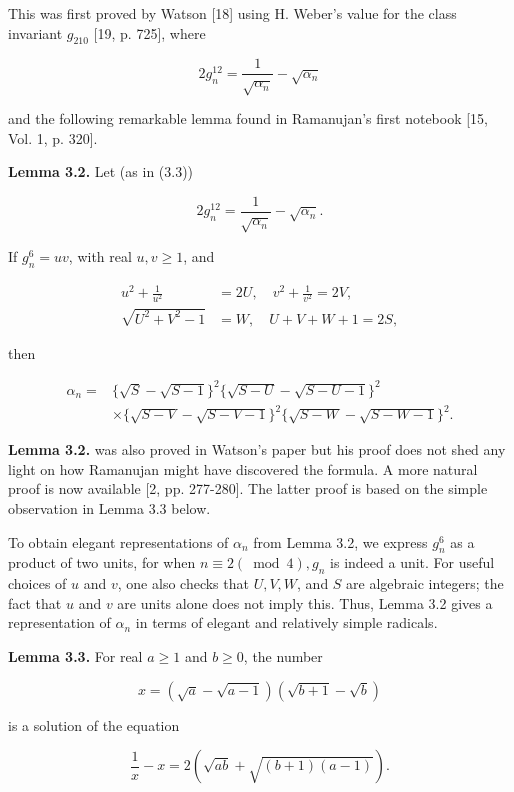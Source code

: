 \documentclass[11pt,letterpaper]{article}
\begin{document}
This was first proved by Watson [18] using H. Weber's value for the class invariant $g_{210}$ [19, p. 725], where


\begin{equation*}
2 g_{n}^{12}=\frac{1}{\sqrt{\alpha_{n}}}-\sqrt{\alpha_{n}} \tag{3.3}\label{eq:3.3}
\end{equation*}


and the following remarkable lemma found in Ramanujan's first notebook [15, Vol. 1, p. 320].

\noindent\textbf{Lemma 3.2.} Let (as in (3.3))

\[
2 g_{n}^{12}=\frac{1}{\sqrt{\alpha_{n}}}-\sqrt{\alpha_{n}} .
\]

If $g_{n}^{6}=u v$, with real $u,v\geq1$, and

\[
\begin{aligned}
u^{2}+\frac{1}{u^{2}} & =2 U, \quad v^{2}+\frac{1}{v^{2}}=2 V, \\
\sqrt{U^{2}+V^{2}-1} & =W, \quad U+V+W+1=2 S,
\end{aligned}
\]

then

\[
\begin{aligned}
\alpha_{n}= & \{\sqrt{S}-\sqrt{S-1}\}^{2}\{\sqrt{S-U}-\sqrt{S-U-1}\}^{2} \\
& \times\{\sqrt{S-V}-\sqrt{S-V-1}\}^{2}\{\sqrt{S-W}-\sqrt{S-W-1}\}^{2} .
\end{aligned}
\]

\noindent\textbf{Lemma 3.2.} was also proved in Watson's paper but his proof does not shed any light on how Ramanujan might have discovered the formula. A more natural proof is now available [2, pp. 277-280]. The latter proof is based on the simple observation in Lemma 3.3 below.

To obtain elegant representations of $\alpha_{n}$ from Lemma 3.2, we express $g_{n}^{6}$ as a product of two units, for when $n \equiv 2(\bmod 4), g_{n}$ is indeed a unit. For useful choices of $u$ and $v$, one also checks that $U,V,W$, and $S$ are algebraic integers; the fact that $u$ and $v$ are units alone does not imply this. Thus, Lemma 3.2 gives a representation of $\alpha_{n}$ in terms of elegant and relatively simple radicals.

\noindent\textbf{Lemma 3.3.} For real $a\geq1$ and $b\geq0$, the number

\[
x=(\sqrt{a}-\sqrt{a-1})(\sqrt{b+1}-\sqrt{b})
\]

is a solution of the equation


\begin{equation*}
\frac{1}{x}-x=2(\sqrt{a b}+\sqrt{(b+1)(a-1)}) . \tag{3.4}\label{eq:3.4}
\end{equation*}
\end{document}
